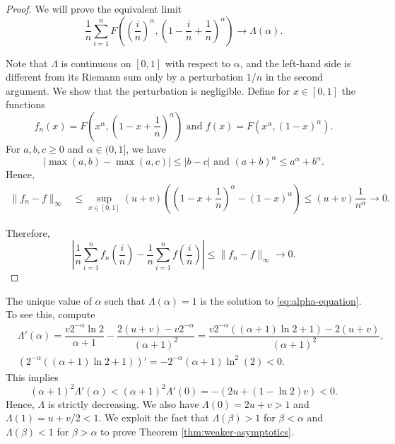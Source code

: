 \begin{proof}
  We will prove the equivalent limit
  $$\dfrac{1}{n}\sum\limits_{i=1}^n F\left(\left(\dfrac{i}{n}\right)^\alpha, \left(1-\dfrac{i}{n}+\dfrac{1}{n}\right)^\alpha\right) \to \Lambda(\alpha).$$

  Note that $\Lambda$ is continuous on $[0,1]$ with respect to $\alpha$, and the left-hand side is different from its Riemann sum only by a perturbation $1/n$ in the second argument. We show that the perturbation is negligible. Define for $x\in [0,1]$ the functions
  $$f_n(x) = F\left(x^\alpha, \left(1-x+\dfrac{1}{n}\right)^\alpha\right) \text{ and } f(x) = F(x^\alpha, (1-x)^\alpha).$$
  For $a,b,c \ge 0$ and $\alpha \in (0,1]$, we have
  $$|\max(a,b) - \max(a,c)| \le |b-c| \text{ and }
    (a+b)^\alpha \le a^\alpha + b^\alpha.$$
  Hence,
  \begin{align*}
    \|f_n-f\|_\infty
     & \le \sup\limits_{x\in[0,1]}(u+v)\left(\left(1-x+\dfrac{1}{n}\right)^\alpha - (1-x)^\alpha\right) \le (u+v)\dfrac{1}{n^\alpha} \to 0.
  \end{align*}

  Therefore,
  $$\left|\dfrac{1}{n}\sum\limits_{i=1}^n f_n\left(\dfrac{i}{n}\right) - \dfrac{1}{n}\sum\limits_{i=1}^n f\left(\dfrac{i}{n}\right)\right| \le \|f_n-f\|_\infty \to 0.$$
\end{proof}

The unique value of $\alpha$ such that $\Lambda(\alpha) = 1$ is the solution to \eqref{eq:alpha-equation}. To see this, compute
\begin{align*}
   & \Lambda'(\alpha) = \dfrac{v2^{-\alpha}\ln 2}{\alpha+1} - \dfrac{2(u+v)-v2^{-\alpha}}{(\alpha+1)^2} = \dfrac{v2^{-\alpha}((\alpha+1)\ln 2 + 1) - 2(u+v)}{(\alpha+1)^2}, \\
   & (2^{-\alpha}((\alpha+1)\ln 2 + 1))' = -2^{-\alpha}(\alpha+1)\ln^2(2) < 0.
\end{align*}
This implies
$$(\alpha+1)^2\Lambda'(\alpha) < (\alpha+1)^2\Lambda'(0) = -(2u + (1-\ln 2)v) < 0.$$
Hence, $\Lambda$ is strictly decreasing. We also have $\Lambda(0) = 2u+v > 1$ and $\Lambda(1) = u+v/2 < 1$. We exploit the fact that $\Lambda(\beta) > 1$ for $\beta < \alpha$ and $\Lambda(\beta) < 1$ for $\beta > \alpha$ to prove Theorem \ref{thm:weaker-asymptotics}.

